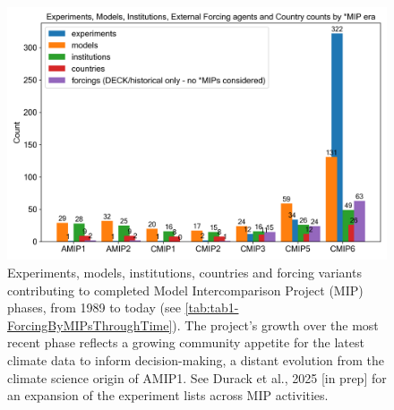 \documentclass[gmd, preprint]{copernicus}
\begin{document}
\begin{figure}
    \centering
    \includegraphics[width=1\linewidth]{230512T112843_MIPEvolution-Counts-plusForcing.png}
    \caption{Experiments, models, institutions, countries and forcing variants contributing to completed Model Intercomparison Project (MIP) phases, from 1989 to today (see \autoref{tab:tab1-ForcingByMIPsThroughTime}). The project's growth over the most recent phase reflects a growing community appetite for the latest climate data to inform decision-making, a distant evolution from the climate science origin of AMIP1. See Durack et al., 2025 [in prep] for an expansion of the experiment lists across MIP activities.}
    \label{fig:fig1-MIPGrowth}
\end{figure}
\end{document}
